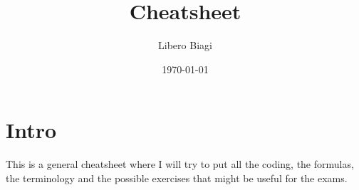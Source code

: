 \documentclass[a4paper,10pt]{article}
\begin{document}
\title{Cheatsheet}
\author{Libero Biagi}

\date{\today}
\maketitle

\section*{Intro}
This is a general cheatsheet where I will try to put all the coding, the formulas, the terminology and the possible exercises that might be useful for the exams.

\tableofcontents

%
%
%
%
%
%



%


\end{document}

